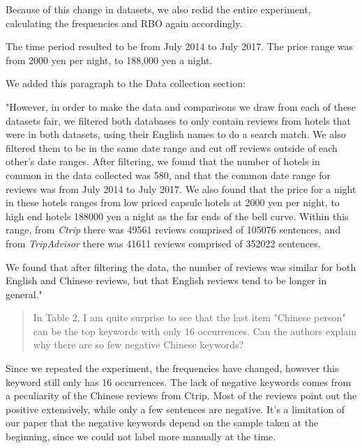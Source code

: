 \documentclass{letter}
\begin{document}
Because of this change in datasets, we also redid the entire experiment, calculating the frequencies and RBO again accordingly. 

The time period resulted to be from July 2014 to July 2017. The price range was from 2000 yen per night, to 188,000 yen a night.

We added this paragraph to the Data collection section:

"However, in order to make the data and comparisons we draw from each of these datasets fair, we filtered both databases to only contain reviews from hotels that were in both datasets, using their English names to do a search match. We also filtered them to be in the same date range and cut off reviews outside of each other's date ranges. After filtering, we found that the number of hotels in common in the data collected was \num[group-separator={,}]{580}, and that the common date range for reviews was from July 2014 to July 2017. We also found that the price for a night in these hotels ranges from low priced capsule hotels at 2000 yen per night, to high end hotels \num[group-separator={,}]{188000} yen a night as the far ends of the bell curve. Within this range, from \textit{Ctrip} there was \num[group-separator={,}]{49561} reviews comprised of \num[group-separator={,}]{105076} sentences, and from \textit{TripAdvisor} there was \num[group-separator={,}]{41611} reviews comprised of \num[group-separator={,}]{352022} sentences.

We found that after filtering the data, the number of reviews was similar for both English and Chinese reviews, but that English reviews tend to be longer in general."



\begin{quotation}
In Table 2, I am quite surprise to see that the last item "Chinese person" can be the top keywords with only 16 occurrences. Can the authors explain why there are so few negative Chinese keywords?
\end{quotation}

Since we repeated the experiment, the frequencies have changed, however this keyword still only has 16 occurrences. The lack of negative keywords comes from a peculiarity of the Chinese reviews from Ctrip. Most of the reviews point out the positive extensively, while only a few sentences are negative. It's a limitation of our paper that the negative keywords depend on the sample taken at the beginning, since we could not label more manually at the time.
\end{document}
